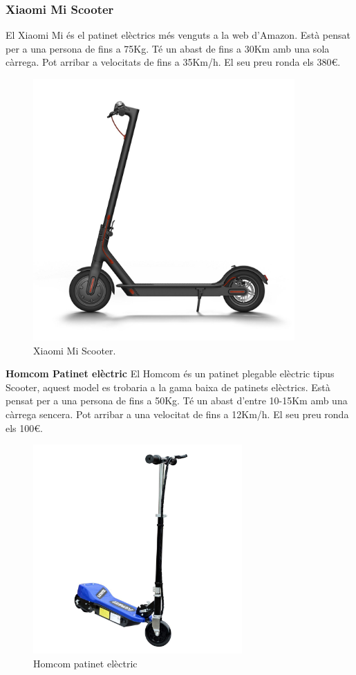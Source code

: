 \subsubsection{Xiaomi Mi Scooter}  %
El Xiaomi Mi és el patinet elèctrics més venguts a la web d'Amazon. Està pensat per a una persona de fins a 75Kg. Té un abast de fins a 30Km amb una sola càrrega. Pot arribar a velocitats de fins a 35Km/h. El seu preu ronda els 380€. 
\begin{figure}[H]
		\centering
    	\includegraphics[width=10cm, height=10cm]{Marcteoric/patinetelectricxiamoi.jpg}
     	\caption{Xiaomi Mi Scooter.}
\end{figure}

\newpage

\textbf{Homcom Patinet elèctric} \bigskip \newline %
El Homcom és un patinet plegable elèctric tipus Scooter, aquest model es trobaria a la gama baixa de patinets elèctrics. Està pensat per a una persona de fins a 50Kg. Té un abast d'entre 10-15Km amb una càrrega sencera. Pot arribar a una velocitat de fins a 12Km/h. El seu preu ronda els 100€.
\begin{figure}[H]
		\centering
    	\includegraphics[width=8cm, height=8cm]{Marcteoric/Homcompatinetelectric.jpg}
     	\caption{Homcom patinet elèctric}
\end{figure}

